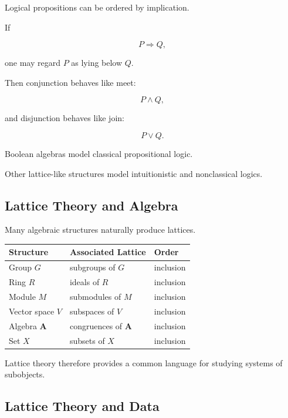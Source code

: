 Logical propositions can be ordered by implication.

If

\[ P\Longrightarrow Q, \]

one may regard \(P\) as lying below \(Q\).

Then conjunction behaves like meet:

\[ P\wedge Q, \]

and disjunction behaves like join:

\[ P\vee Q. \]

Boolean algebras model classical propositional logic.

Other lattice-like structures model intuitionistic and nonclassical logics.

\subsection{Lattice Theory and Algebra}
\label{subsec:lattice-algebra}

Many algebraic structures naturally produce lattices.

\begin{center}
\begin{tabularx}{0.92\textwidth}{@{}lXX@{}}
\toprule
\textbf{Structure} & \textbf{Associated Lattice} & \textbf{Order}\\
\midrule
Group \(G\) & subgroups of \(G\) & inclusion\\
Ring \(R\) & ideals of \(R\) & inclusion\\
Module \(M\) & submodules of \(M\) & inclusion\\
Vector space \(V\) & subspaces of \(V\) & inclusion\\
Algebra \(\mathbf A\) & congruences of \(\mathbf A\) & inclusion\\
Set \(X\) & subsets of \(X\) & inclusion\\
\bottomrule
\end{tabularx}
\end{center}

Lattice theory therefore provides a common language for studying systems of
subobjects.

\subsection{Lattice Theory and Data}
\label{subsec:lattice-data}

